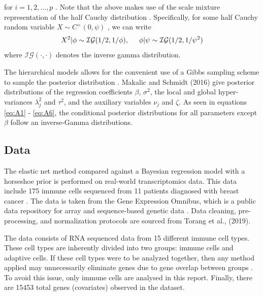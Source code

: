 \documentclass[
	a4paper, %
	10pt, %
	unnumberedsections, %
	twoside, %
]{LTJournalArticle}
\newcommand{\1}{\mathbbm{1}}
\begin{document}
\noindent for $i = 1, 2, \ldots, p$ \cite{Bhadra2017}. Note that the above makes use of the scale mixture representation of the half Cauchy distribution \cite{Banerjee2022}. Specifically, for some half Cauchy random variable $X \sim C^+(0, \psi)$ , we can write 
\begin{equation}
    X^2 | \phi \sim \mathcal{IG}(1/2, 1/\phi), \hspace{5mm} \phi | \psi \sim \mathcal{IG} (1/2, 1/\psi^2)
\end{equation}
\noindent where $\mathcal{IG}(\cdot , \cdot)$ denotes the inverse gamma distribution. 

The hierarchical models allows for the convenient use of a Gibbs sampling scheme to sample the posterior distribution \cite{Makalic2016}. Makalic and Schmidt (2016) give posterior distributions of the regression coefficients $\beta$, $\sigma^2$, the local and global hyper-variances $\lambda_j^2$ and $\tau^2$, and the auxiliary variables $\nu_j$ and $\zeta$.  As seen in equations \eqref{eq:A1} - \eqref{eq:A6}, the conditional posterior distributions for all parameters except $\beta$ follow an inverse-Gamma distributions. 

\subsection{Data}

The elastic net method compared against a Bayesian regression model with a horseshoe prior is performed on real-world transcriptomics data. This data include 175 immune cells sequenced from 11 patients diagnosed with breast cancer \cite{Chung2017}. The data is taken from the Gene Expression Omnibus, which is a public data repository for array and sequence-based genetic data \cite{Edgar2002}. Data cleaning, pre-processing, and normalization protocols are sourced from Torang et al., (2019). 

The data consists of RNA sequenced data from 15 different immune cell types. These cell types are inherently divided into two groups: immune cells and adaptive cells. If these cell types were to be analyzed together, then any method applied may unnecessarily eliminate genes due to gene overlap between groups \cite{Torang2019}. To avoid this issue, only immune cells are analysed in this report. Finally, there are 15453 total genes (covariates) observed in the dataset. 
\end{document}
